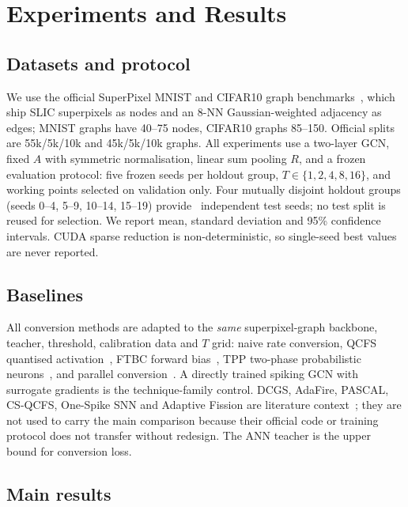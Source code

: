 \section{Experiments and Results}
\label{sec:experiments}

\subsection{Datasets and protocol}
\label{ssec:data}

We use the official SuperPixel MNIST and CIFAR10 graph benchmarks~\cite{dwivedi2023}, which ship SLIC superpixels as nodes and an 8-NN Gaussian-weighted adjacency as edges; MNIST graphs have 40--75 nodes, CIFAR10 graphs 85--150. Official splits are 55k/5k/10k and 45k/5k/10k graphs. All experiments use a two-layer GCN, fixed $A$ with symmetric normalisation, linear sum pooling $R$, and a frozen evaluation protocol: five frozen seeds per holdout group, $T\in\{1,2,4,8,16\}$, and working points selected on validation only. Four mutually disjoint holdout groups (seeds 0--4, 5--9, 10--14, 15--19) provide \TotalSeeds\ independent test seeds; no test split is reused for selection. We report mean, standard deviation and 95\% confidence intervals. CUDA sparse reduction is non-deterministic, so single-seed best values are never reported.

\subsection{Baselines}
\label{ssec:baselines}

All conversion methods are adapted to the \emph{same} superpixel-graph backbone, teacher, threshold, calibration data and $T$ grid: naive rate conversion, QCFS quantised activation~\cite{bu2022qcfs}, FTBC forward bias~\cite{wu2024ftbc}, TPP two-phase probabilistic neurons~\cite{bojkovic2025tpp}, and parallel conversion~\cite{hao2025parallel}. A directly trained spiking GCN with surrogate gradients is the technique-family control. DCGS, AdaFire, PASCAL, CS-QCFS, One-Spike SNN and Adaptive Fission are literature context~\cite{huang2025dcgs,wang2025adafire,ramesh2025pascal,yang2025csqcfs,hwang2025onespike,jiang2025fission}; they are not used to carry the main comparison because their official code or training protocol does not transfer without redesign. The ANN teacher is the upper bound for conversion loss.

\subsection{Main results}
\label{ssec:main}

